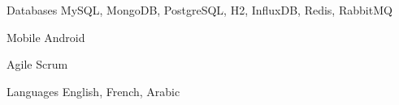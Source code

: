 \begin{cvskills}
\cvskill
{Databases} %
{MySQL, MongoDB, PostgreSQL, H2, InfluxDB, Redis, RabbitMQ} %

\cvskill
{Mobile} %
{Android} %

\cvskill
{Agile} %
{Scrum} %


\cvskill
{Languages} %
{English, French, Arabic} %


\end{cvskills}
